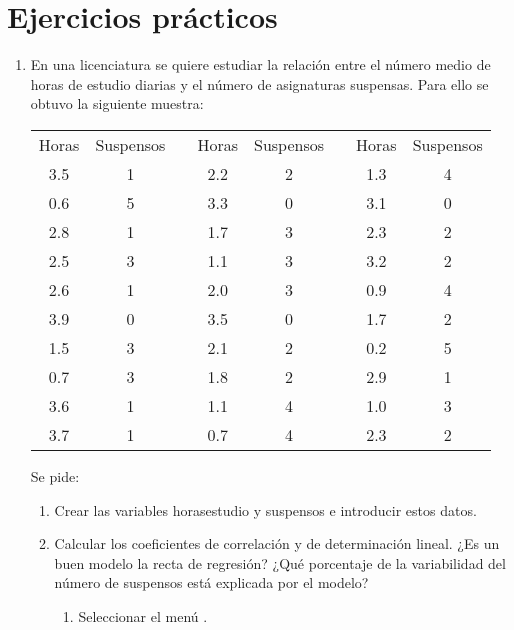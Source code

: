 \section{Ejercicios prácticos}
\begin{enumerate}[leftmargin=*]

\item  En una licenciatura se quiere estudiar la relación entre el número
medio de horas de estudio diarias y el número de asignaturas suspensas. Para ello se
obtuvo la siguiente muestra:
\begin{center}
\begin{tabular}{cccccccc}
  Horas & Suspensos &  & Horas & Suspensos & & Horas & Suspensos  \\
  \cline{1-2}\cline{4-5}\cline{7-8}
  3.5 & 1 & & 2.2 & 2 & & 1.3 & 4 \\
  0.6 & 5 & & 3.3 & 0 & & 3.1 & 0 \\
  2.8 & 1 & & 1.7 & 3 & & 2.3 & 2 \\
  2.5 & 3 & & 1.1 & 3 & & 3.2 & 2 \\
  2.6 & 1 & & 2.0 & 3 & & 0.9 & 4 \\
  3.9 & 0 & & 3.5 & 0 & & 1.7 & 2 \\
  1.5 & 3 & & 2.1 & 2 & & 0.2 & 5 \\
  0.7 & 3 & & 1.8 & 2 & & 2.9 & 1 \\
  3.6 & 1 & & 1.1 & 4 & & 1.0 & 3 \\
  3.7 & 1 & & 0.7 & 4 & & 2.3 & 2 \\
\end{tabular}

\end{center}

Se pide:

\begin{enumerate}
\item  Crear las variables \textsf{horasestudio} y
\textsf{suspensos} e introducir estos datos.

\item Calcular los coeficientes de correlación y de determinación
lineal. ¿Es un buen modelo la recta de regresión? ¿Qué porcentaje
de la variabilidad del número de suspensos está explicada por el
modelo?

\begin{indicacion}{
\begin{enumerate}
\item Seleccionar el menú .


\end{enumerate}}
\end{indicacion}
\end{enumerate}
\end{enumerate}
